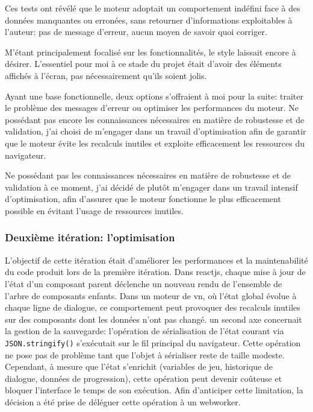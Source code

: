 Ces tests ont révélé que le moteur adoptait un comportement indéfini face à des données manquantes ou erronées, sans retourner d'informations exploitables à l'auteur: pas de message d'erreur, aucun moyen de savoir quoi corriger.

M’étant principalement focalisé sur les fonctionnalités, le style laissait encore à désirer. L'essentiel pour moi à ce stade du projet était d'avoir des éléments affichés à l'écran, pas nécessairement qu'ils soient jolis.



Ayant une base fonctionnelle, deux options s'offraient à moi pour la suite: traiter le problème des messages d'erreur ou optimiser les performances du moteur. Ne possédant pas encore les connaissances nécessaires en matière de robustesse et de validation, j'ai choisi de m'engager dans un travail d'optimisation afin de garantir que le moteur évite les recalculs inutiles et exploite efficacement les ressources du navigateur.

Ne possédant pas les connaissances nécessaires en matière de robustesse et de validation à ce moment, j'ai décidé de plutôt m'engager dans un travail intensif d'optimisation, afin d'assurer que le moteur fonctionne le plus efficacement possible en évitant l'usage de ressources inutiles.


\subsubsection{Deuxième itération: l'optimisation}


L'objectif de cette itération était d'améliorer les performances et la maintenabilité du code produit lors de la première itération. Dans \gls{reactjs}, chaque mise à jour de l'état d'un composant parent déclenche un nouveau rendu de l'ensemble de l'arbre de composants enfants. Dans un moteur de \gls{vn}, où l'état global évolue à chaque ligne de dialogue, ce comportement peut provoquer des recalculs inutiles sur des composants dont les données n'ont pas changé. un second axe concernait la gestion de la sauvegarde: l'opération de sérialisation de l'état courant via \texttt{JSON.stringify()} s'exécutait sur le fil principal du navigateur. Cette opération ne pose pas de problème tant que l'objet à sérialiser reste de taille modeste. Cependant, à mesure que l'état s'enrichit (variables de jeu, historique de dialogue, données de progression), cette opération peut devenir coûteuse et bloquer l'interface le temps de son exécution. Afin d'anticiper cette limitation, la décision a été prise de déléguer cette opération à un \gls{webworker}.


